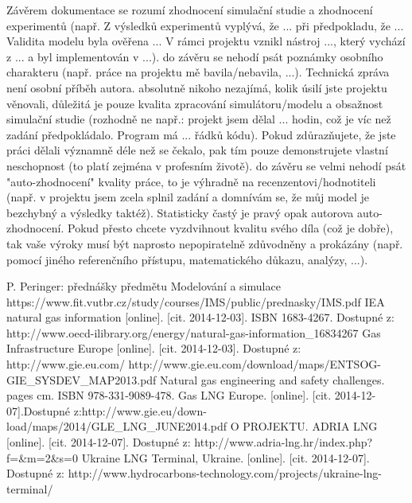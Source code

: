 \documentclass[a4paper,11pt]{article}
\begin{document}
Závěrem dokumentace se rozumí zhodnocení simulační studie a zhodnocení experimentů (např. Z výsledků experimentů vyplývá, že ... při předpokladu, že ... Validita modelu byla ověřena ... V rámci projektu vznikl nástroj ..., který vychází z ... a byl implementován v ...).
do závěru se nehodí psát poznámky osobního charakteru (např. práce na projektu mě bavila/nebavila, ...). Technická zpráva není osobní příběh autora.
absolutně nikoho nezajímá, kolik úsilí jste projektu věnovali, důležitá je pouze kvalita zpracování simulátoru/modelu a obsažnost simulační studie (rozhodně ne např.: projekt jsem dělal ... hodin, což je víc než zadání předpokládalo. Program má ... řádků kódu). Pokud zdůrazňujete, že jste práci dělali významně déle než se čekalo, pak tím pouze demonstrujete vlastní neschopnost (to platí zejména v profesním životě).
do závěru se velmi nehodí psát "auto-zhodnocení" kvality práce, to je výhradně na recenzentovi/hodnotiteli (např. v projektu jsem zcela splnil zadání a domnívám se, že můj model je bezchybný a výsledky taktéž). Statisticky častý je pravý opak autorova auto-zhodnocení. Pokud přesto chcete vyzdvihnout kvalitu svého díla (což je dobře), tak vaše výroky musí být naprosto nepopiratelně zdůvodněny a prokázány (např. pomocí jiného referenčního přístupu, matematického důkazu, analýzy, ...).


\newpage
\renewcommand{\refname}{Literatura a použité zdroje}
\begin{thebibliography}{99}
P. Peringer: přednášky předmětu Modelování a simulace
https://www.fit.vutbr.cz/study/courses/IMS/public/prednasky/IMS.pdf	
 IEA natural gas information [online]. [cit. 2014-12-03]. ISBN 1683-4267. Dostupné z: http://www.oecd-ilibrary.org/energy/natural-gas-information{\_}16834267
 Gas Infrastructure Europe [online]. [cit. 2014-12-03]. Dostupné z: http://www.gie.eu.com/
 http://www.gie.eu.com/download/maps/ENTSOG-GIE{\_}SYSDEV{\_}MAP2013.pdf
 Natural gas engineering and safety challenges. pages cm. ISBN 978-331-9089-478.
Gas LNG Europe. [online]. [cit. 2014-12-07].Dostupné z:http://www.gie.eu/down-
load/maps/2014/GLE{\_}LNG{\_}JUNE2014.pdf
O PROJEKTU. ADRIA LNG [online]. [cit. 2014-12-07]. Dostupné z: http://www.adria-lng.hr/index.php?f={\&}m=2{\&}s=0
Ukraine LNG Terminal, Ukraine. [online]. [cit. 2014-12-07]. Dostupné z: http://www.hydrocarbons-technology.com/projects/ukraine-lng-terminal/
\end{thebibliography}
\end{document}
